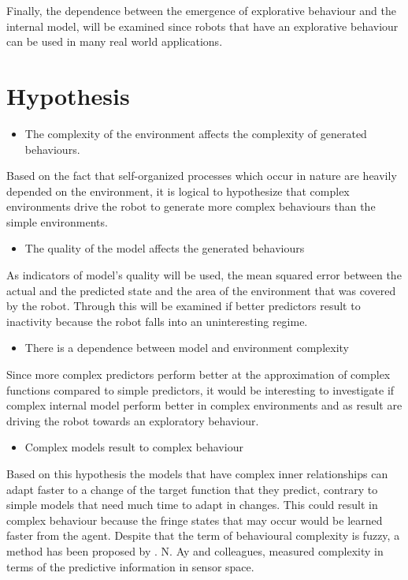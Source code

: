 \documentclass[msc,ai,logo]{infthesis}
\begin{document}
Finally, the dependence between the emergence of explorative behaviour and the internal model, will be examined  since robots that have an explorative behaviour can be used in many real world applications.

\section{Hypothesis}   
\begin{itemize}
\item The complexity of the environment affects the complexity of generated behaviours.
\end{itemize}
Based on the fact that self-organized processes which occur in nature are heavily depended on the environment, it is logical to hypothesize that complex environments drive the robot to generate more complex behaviours than the simple environments. 
\begin{itemize}
\item The quality of the model affects the generated behaviours
\end{itemize}
As indicators of model's quality will be used, the mean squared error between the actual and the predicted state and the area of the environment that was covered by the robot. Through this will be examined if better predictors result to inactivity because the robot falls into an uninteresting regime.
\begin{itemize}
\item There is a dependence between model and environment complexity
\end{itemize}
Since more complex predictors perform better at the approximation of complex functions compared to simple predictors, it would be interesting to investigate if complex internal model perform better in complex environments and as result are driving the robot towards an exploratory behaviour.
\begin{itemize}
\item Complex models result to complex behaviour 
\end{itemize}
Based on this hypothesis the models that have complex inner relationships can adapt faster to a change of the target function that they predict, contrary to simple models that need much time to adapt in changes. This could result in complex behaviour because the fringe states that may occur would be learned faster from the agent. Despite that the term of behavioural complexity is fuzzy, a method has been proposed by \cite{ay08}. N. Ay and colleagues, measured complexity in terms of the predictive information in sensor space. 
\end{document}
